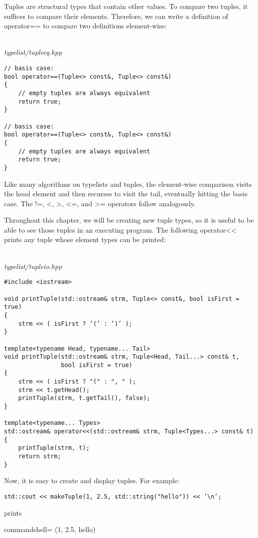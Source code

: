 



Tuples are structural types that contain other values. To compare two tuples, it suffices to compare their elements. Therefore, we can write a definition of operator== to compare two definitions element-wise:

\hspace*{\fill} \\ %
\noindent
\textit{typelist/tupleeq.hpp}
\begin{lstlisting}[style=styleCXX]
// basis case:
bool operator==(Tuple<> const&, Tuple<> const&)
{
	// empty tuples are always equivalent
	return true;
}

// basis case:
bool operator==(Tuple<> const&, Tuple<> const&)
{
	// empty tuples are always equivalent
	return true;
}
\end{lstlisting}

Like many algorithms on typelists and tuples, the element-wise comparison visits the head element and then recurses to visit the tail, eventually hitting the basis case. The !=, <, >, <=, and >= operators follow analogously.


Throughout this chapter, we will be creating new tuple types, so it is useful to be able to see those tuples in an executing program. The following operator<< prints any tuple whose element types can be printed:

\hspace*{\fill} \\ %
\noindent
\textit{typelist/tupleio.hpp}
\begin{lstlisting}[style=styleCXX]
#include <iostream>

void printTuple(std::ostream& strm, Tuple<> const&, bool isFirst = true)
{
	strm << ( isFirst ? ’(’ : ’)’ );
}

template<typename Head, typename... Tail>
void printTuple(std::ostream& strm, Tuple<Head, Tail...> const& t,
				bool isFirst = true)
{
	strm << ( isFirst ? "(" : ", " );
	strm << t.getHead();
	printTuple(strm, t.getTail(), false);
}

template<typename... Types>
std::ostream& operator<<(std::ostream& strm, Tuple<Types...> const& t)
{
	printTuple(strm, t);
	return strm;
}
\end{lstlisting}

Now, it is easy to create and display tuples. For example:

\begin{lstlisting}[style=styleCXX]
std::cout << makeTuple(1, 2.5, std::string("hello")) << ’\n’;
\end{lstlisting}

prints

\begin{tcblisting}{commandshell={}}
(1, 2.5, hello)
\end{tcblisting}





















